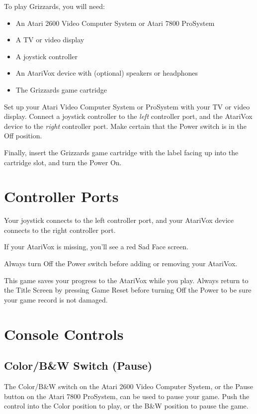 \documentclass[10pt,twoside,openright]{memoir}
\begin{document}
To play Grizzards, you will need:

\begin{itemize}
\item An Atari 2600 Video Computer System or Atari 7800 ProSystem
\item A TV or video display
\item A joystick controller
\item An AtariVox device with (optional) speakers or headphones
\item The Grizzards game cartridge
\end{itemize}

Set up your  Atari Video Computer System or ProSystem  with your TV or
video  display.  Connect  a  joystick controller  to  the  \emph{left}
controller  port,   and  the  AtariVox  device   to  the  \emph{right}
controller port.  Make certain  that the  Power switch  is in  the Off
position.

Finally, insert the Grizzards game cartridge with the
label facing up into the cartridge slot, and turn the Power On.

\section{Controller Ports}

Your joystick  connects to the  left controller port, and  your AtariVox
device connects to the right controller port.

If your AtariVox is missing, you'll see a red Sad Face screen.

Always   turn  Off   the  Power   switch  before   adding  or   removing
your AtariVox.

This  game  saves  your  progress   to  the  AtariVox  while  you  play.
Always return to the Title Screen  by pressing Game Reset before turning
Off the Power to be sure your game record is not damaged.

\section{Console Controls}

\subsection{Color/B\&W Switch (Pause)}

The Color/B\&W switch on the Atari  2600 Video Computer System, or the
Pause button  on the Atari 7800  ProSystem, can be used  to pause your
game. Push  the control into the  Color position to play,  or the B\&W
position to pause the game.
\end{document}
